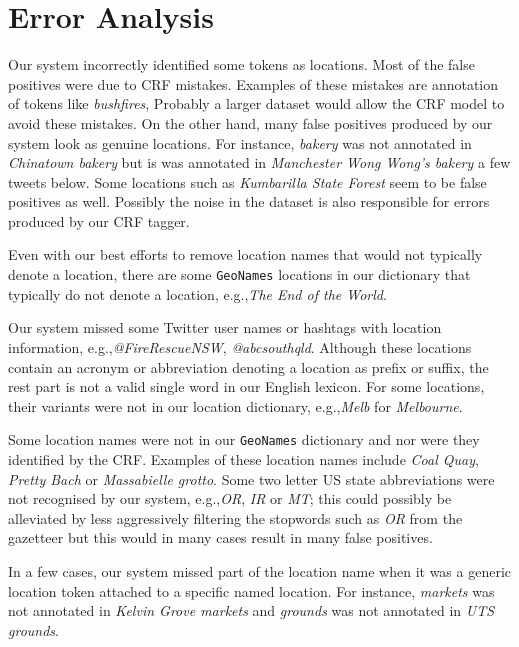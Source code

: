 \documentclass[11pt]{article}
\newcommand{\eg}{e.g.,\xspace}
\newcommand{\geoname}{\texttt{GeoNames}\xspace}
\newcommand{\myex}[1]{\textit{#1}}
\begin{document}
\section{Error Analysis}
\label{sec:error_analysis}

Our system incorrectly identified some tokens as locations.
Most of the false positives were due to CRF mistakes.
Examples of these mistakes are annotation of tokens like \myex{bushfires}, 
Probably a larger dataset would allow the CRF model to avoid these mistakes.
On the other hand, many false positives produced by our system look as genuine locations.
For instance, \myex{bakery} was not annotated in \myex{Chinatown bakery} but is was annotated in \myex{Manchester Wong Wong's bakery} a few tweets below.
Some locations such as \myex{Kumbarilla State Forest} seem to be false positives as well.
Possibly the noise in the dataset is also responsible for errors produced by our CRF tagger.


Even with our best efforts to remove location names that would not typically denote a location, there are some \geoname locations in our dictionary that typically do not denote a location, \eg \myex{The End of the World}.

Our system missed some Twitter user names or hashtags with location information, \eg \myex{@FireRescueNSW}, \myex{@abcsouthqld}.
Although these locations contain an acronym or abbreviation denoting a location as prefix or suffix, the rest part is not a valid single word in our English lexicon.
For some locations, their variants were not in our location dictionary, \eg \myex{Melb} for \myex{Melbourne}.

Some location names were not in our \geoname dictionary and nor were they identified by the CRF.
Examples of these location names include \myex{Coal Quay}, \myex{Pretty Bach} or \myex{Massabielle grotto}.
Some two letter US state abbreviations were not recognised by our system, \eg \myex{OR}, \myex{IR} or \myex{MT}; this could possibly be alleviated by less aggressively filtering the stopwords such as \myex{OR} from the gazetteer but this would in many cases result in many false positives.

In a few cases, our system missed part of the location name when it was a generic location token attached to a specific named location.
For instance, \myex{markets} was not annotated in \myex{Kelvin Grove markets} and \myex{grounds} was not annotated in \myex{UTS grounds}.
\end{document}
